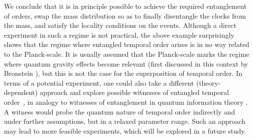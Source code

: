\documentclass[a4paper,11pt]{article}
\newcommand{\blue}[1]{\textcolor{blue}{#1}}
\begin{document}
We conclude that it is in principle possible to achieve the required entanglement of orders, swap the mass distribution so as to finally disentangle the clocks from the mass, and satisfy the locality conditions on the events. Although {a direct  experiment in such a regime is not practical, } the above example surprisingly shows that the  regime  where entangled temporal order arises  is in no way related to the Planck-scale. It is usually assumed that the Planck-scale marks the regime where quantum gravity effects become relevant (first discussed in this context by Bronstein \cite{gorelik1992first}), but this is not the case for the superposition of temporal order.
{In terms of a potential experiment,} one could also take a different (theory-dependent) approach and explore possible witnesses of entangled temporal order~\cite{araujo15}, in analogy to witnesses of entanglement in quantum information theory \cite{TERHAL2000319}. A witness would probe the quantum nature of temporal order indirectly and under further assumptions, but in a relaxed parameter range. Such an approach may lead to more feasible experiments, which will be explored in a future study.
\end{document}

